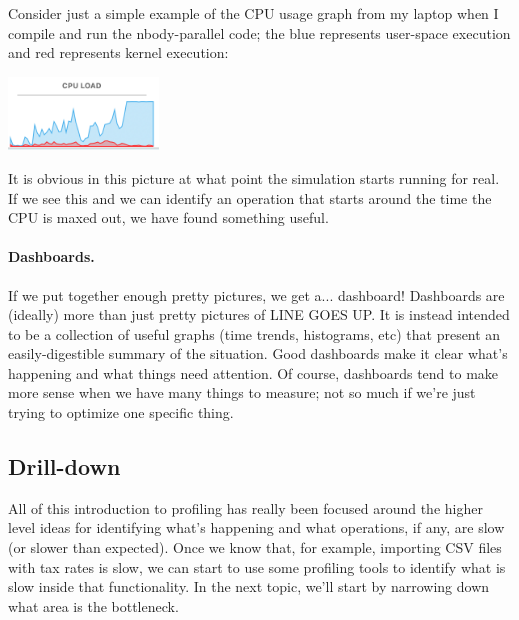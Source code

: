 Consider just a simple example of the CPU usage graph from my laptop when I compile and run the nbody-parallel code; the blue represents user-space execution and red represents kernel execution:

\begin{center}
	\includegraphics[width=0.3\textwidth]{images/cpu-load.png}
\end{center}

It is obvious in this picture at what point the simulation starts running for real. If we see this and we can identify an operation that starts around the time the CPU is maxed out, we have found something useful.

\paragraph{Dashboards.} If we put together enough pretty pictures, we get a... dashboard! Dashboards are (ideally) more than just pretty pictures of LINE GOES UP. It is instead intended to be a collection of useful graphs (time trends, histograms, etc) that present an easily-digestible summary of the situation. Good dashboards make it clear what's happening and what things need attention. Of course, dashboards tend to make more sense when we have many things to measure; not so much if we're just trying to optimize one specific thing.

\subsection*{Drill-down}
All of this introduction to profiling has really been focused around the higher level ideas for identifying what's happening and what operations, if any, are slow (or slower than expected). Once we know that, for example, importing CSV files with tax rates is slow, we can start to use some profiling tools to identify what is slow inside that functionality.  In the next topic, we'll start by narrowing down what area is the bottleneck. 





